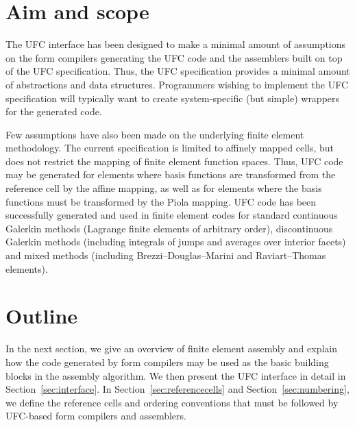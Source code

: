\section{Aim and scope}

The UFC interface has been designed to make a minimal amount of
assumptions on the form compilers generating the UFC code and the
assemblers built on top of the UFC specification. Thus, the UFC
specification provides a minimal amount of abstractions and data
structures. Programmers wishing to implement the UFC specification
will typically want to create system-specific (but simple) wrappers
for the generated code.

Few assumptions have also been made on the underlying finite element
methodology. The current specification is limited to affinely mapped
cells, but does not restrict the mapping of finite element function
spaces. Thus, UFC code may be generated for elements where basis
functions are transformed from the reference cell by the affine
mapping, as well as for elements where the basis functions must be
transformed by the Piola mapping. UFC code has been successfully
generated and used in finite element codes for standard continuous
Galerkin methods (Lagrange finite elements of arbitrary order),
discontinuous Galerkin methods (including integrals of jumps and
averages over interior facets) and mixed methods (including
Brezzi--Douglas--Marini and Raviart--Thomas elements).

\section{Outline}

In the next section, we give an overview of finite element assembly and
explain how the code generated by form compilers may be used as the
basic building blocks in the assembly algorithm. We then present the
UFC interface in detail in Section~\ref{sec:interface}. In
Section~\ref{sec:referencecells} and Section~\ref{sec:numbering}, we
define the reference cells and ordering conventions that must be
followed by UFC-based form compilers and assemblers.

